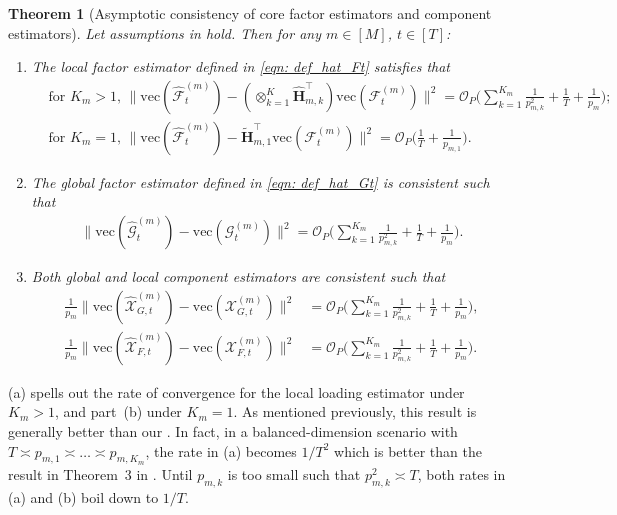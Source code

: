 \documentclass[aos]{imsart}
\theoremstyle{plain}
\newtheorem{theorem}{Theorem}[section]
\theoremstyle{definition}
\def\wt#1{\widetilde{#1}}
\def\wh#1{\widehat{#1}}
\def\cF{\mathcal{F}}
\def\cG{\mathcal{G}} \def\cH{\boldsymbol{\mathcal{H}}} \def\cI{\mathcal{I}}
\def\cO{\mathcal{O}}
\def\cX{\mathcal{X}}
\def\bH{\mathbf{H}}
\def\trans{\intercal}
\def\vec{\mathrm{vec}}
\begin{document}
\begin{theorem}[Asymptotic consistency of core factor estimators and component estimators]\label{thm: core_factor}
Let assumptions in  hold. Then for any $m\in[M]$, $t\in[T]$:
\begin{enumerate}[itemsep=0pt, label = (\alph*), left = 0pt]
    \item The local factor estimator defined in \eqref{eqn: def_hat_Ft} satisfies that
    \begin{align*}
        & \text{for } K_m> 1, \,
        \Big\| \vec(\wh{\cF}_t^{(m)}) - (\otimes_{k=1}^K \wh{\bH}_{m,k}^\trans) \vec(\cF_t^{(m)}) \Big\|^2 = \cO_P\Big( \sum_{k=1}^{K_m} \frac{1}{p_{m,k}^2} + \frac{1}{T} + \frac{1}{p_m} \Big) ; \\
        & \text{for } K_m =1, \,
        \Big\| \vec(\wh{\cF}_t^{(m)}) - \wt{\bH}_{m,1}^\trans \vec(\cF_t^{(m)}) \Big\|^2 = \cO_P\Big( \frac{1}{T} + \frac{1}{p_{m,1}} \Big) .
    \end{align*}
    \item The global factor estimator defined in \eqref{eqn: def_hat_Gt} is consistent such that 
    \begin{align*}
        \big\| \vec(\wh{\cG}_t^{(m)}) - \vec(\cG_t^{(m)}) \big\|^2 = \cO_P\Big( \sum_{k=1}^{K_m} \frac{1}{p_{m,k}^2} + \frac{1}{T} + \frac{1}{p_m} \Big) .
    \end{align*}
    \item Both global and local component estimators are consistent such that
    \begin{align*}
        \frac{1}{p_m} \big\| \vec(\wh\cX_{G,t}^{(m)}) -\vec(\cX_{G,t}^{(m)}) \big\|^2 &= \cO_P\Big( \sum_{k=1}^{K_m} \frac{1}{p_{m,k}^2} + \frac{1}{T} + \frac{1}{p_m} \Big) , \\
        \frac{1}{p_m} \big\| \vec(\wh\cX_{F,t}^{(m)}) -\vec(\cX_{F,t}^{(m)}) \big\|^2 &= \cO_P\Big( \sum_{k=1}^{K_m} \frac{1}{p_{m,k}^2} + \frac{1}{T} + \frac{1}{p_m} \Big) .
    \end{align*}
\end{enumerate}
\end{theorem}


(a) spells out the rate of convergence for the local loading estimator under $K_m>1$, and part~(b) under $K_m=1$. As mentioned previously, this result is generally better than our . In fact, in a balanced-dimension scenario with $T\asymp p_{m,1}\asymp \dots \asymp p_{m,K_m}$, the rate in (a) becomes $1/T^2$ which is better than the result in Theorem~3 in \cite{Zhangetal2025}. Until $p_{m,k}$ is too small such that $p_{m,k}^2 \asymp T$, both rates in (a) and (b) boil down to $1/T$.
\end{document}

